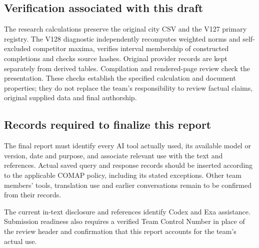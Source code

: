 \subsection*{Verification associated with this draft}
The research calculations preserve the original city CSV and the V127 primary
registry. The V128 diagnostic independently recomputes weighted norms and
self-excluded competitor maxima, verifies interval membership of constructed
completions and checks source hashes. Original provider records are kept
separately from derived tables. Compilation and rendered-page review check the
presentation. These checks establish the specified calculation and document
properties; they do not replace the team's responsibility to review factual
claims, original supplied data and final authorship.

\subsection*{Records required to finalize this report}
The final report must identify every AI tool actually used, its available
model or version, date and purpose, and associate relevant use with the text
and references. Actual saved query and response records should be inserted
according to the applicable COMAP policy, including its stated exceptions.
Other team members' tools, translation use and earlier conversations remain
to be confirmed from their records.

The current in-text disclosure and references identify Codex and Exa
assistance. Submission readiness also requires a verified Team Control Number
in place of the review header and confirmation that this report accounts for
the team's actual use.
